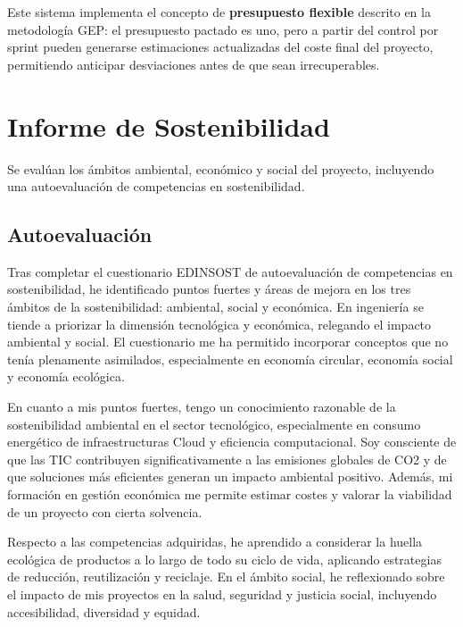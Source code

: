 \documentclass{article}
\begin{document}
    \justify
    Este sistema implementa el concepto de \textbf{presupuesto flexible} descrito 
    en la metodología GEP: el presupuesto pactado es uno, pero a partir del control 
    por sprint pueden generarse estimaciones actualizadas del coste final del proyecto, 
    permitiendo anticipar desviaciones antes de que sean irrecuperables.


    \newpage
    \section{Informe de Sostenibilidad}
    \normalsize
    \setlength{\parskip}{0.6em}
    \justify
     Se evalúan los ámbitos ambiental, económico y social del proyecto, incluyendo una autoevaluación de competencias en sostenibilidad.
    
    \subsection{Autoevaluación}
    \normalsize
    \setlength{\parskip}{0.6em}
    \justify
    Tras completar el cuestionario EDINSOST de autoevaluación de competencias en
    sostenibilidad, he identificado puntos fuertes y áreas de mejora en los tres
    ámbitos de la sostenibilidad: ambiental, social y económica. En ingeniería se
    tiende a priorizar la dimensión tecnológica y económica, relegando el impacto
    ambiental y social. El cuestionario me ha permitido incorporar conceptos que
    no tenía plenamente asimilados, especialmente en economía circular, economía
    social y economía ecológica.
    
    \justify
    En cuanto a mis puntos fuertes, tengo un conocimiento razonable de la
    sostenibilidad ambiental en el sector tecnológico, especialmente en consumo
    energético de infraestructuras Cloud y eficiencia computacional. Soy consciente
    de que las TIC contribuyen significativamente a las emisiones globales de CO2 y
    de que soluciones más eficientes generan un impacto ambiental positivo. Además,
    mi formación en gestión económica me permite estimar costes y valorar la
    viabilidad de un proyecto con cierta solvencia.
    
    \justify
    Respecto a las competencias adquiridas, he aprendido a considerar la huella
    ecológica de productos a lo largo de todo su ciclo de vida, aplicando
    estrategias de reducción, reutilización y reciclaje. En el ámbito social, he
    reflexionado sobre el impacto de mis proyectos en la salud, seguridad y
    justicia social, incluyendo accesibilidad, diversidad y equidad.
    
\end{document}
